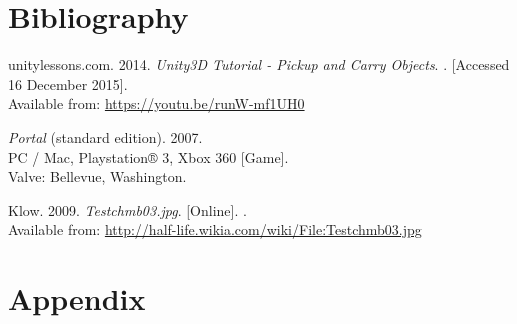 \section{Bibliography}
\begin{thebibliography}{widestlabel}
	unitylessons.com. 2014. \textit{Unity3D Tutorial - Pickup and Carry Objects}.
	\newline
	[Online]. [Accessed 16 December 2015].\\
	Available from: \url{https://youtu.be/runW-mf1UH0}
	
	\textit{Portal} (standard edition). 2007.\\
	PC / Mac, Playstation® 3, Xbox 360 [Game].\\
	Valve: Bellevue, Washington.
	
	Klow. 2009. \textit{Testchmb03.jpg}. [Online].
	.\\
	Available from: \url{http://half-life.wikia.com/wiki/File:Testchmb03.jpg}
\end{thebibliography}

\pagebreak
\section{Appendix}
